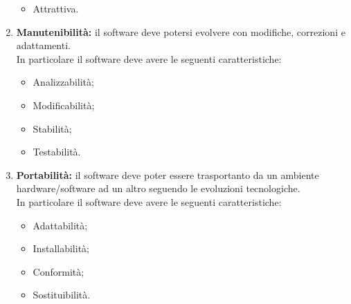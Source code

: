 \begin{enumerate}
\begin{itemize}
			\item Attrattiva.
		\end{itemize}
	\item \textbf{Manutenibilità:} il software deve potersi evolvere con modifiche, correzioni e adattamenti.\\In particolare il software deve avere le seguenti caratteristiche:
		\begin{itemize}
			\item Analizzabilità;
			\item Modificabilità;
			\item Stabilità;
			\item Testabilità.
		\end{itemize}
	\item \textbf{Portabilità:} il software deve poter essere trasportanto da un ambiente hardware/software ad un altro seguendo le evoluzioni tecnologiche.\\In particolare il software deve avere le seguenti caratteristiche:
		\begin{itemize}
			\item Adattabilità;
			\item Installabilità;
			\item Conformità;
			\item Sostituibilità.
		\end{itemize}
\end{enumerate}
